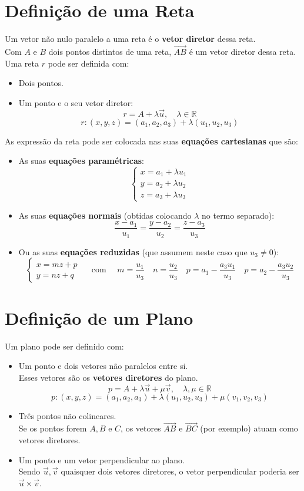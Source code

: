 \documentclass[]{report}
\begin{document}
\section{Definição de uma Reta}
Um vetor não nulo paralelo a uma reta é o \textbf{vetor diretor} dessa reta.\\
Com $A$ e $B$ dois pontos distintos de uma reta, $\overrightarrow{AB}$ é um vetor diretor dessa reta.\\[2mm]
Uma reta $r$ pode ser definida com:
\begin{itemize}
\item Dois pontos.
\item Um ponto e o seu vetor diretor:
$$r = A + \lambda \vec u, \quad \lambda \in \mathbb{R}$$
$$r: (x, y, z) = (a_1, a_2, a_3) + \lambda(u_1, u_2, u_3)$$
\end{itemize}
\vspace{2mm}
As expressão da reta pode ser colocada nas suas \textbf{equações cartesianas} que são:
\begin{itemize}
\item As suas \textbf{equações paramétricas}:
$$
\begin{cases}
x = a_1 + \lambda u_1\\
y = a_2 + \lambda u_2\\
z = a_3 + \lambda u_3
\end{cases}
$$
\item As suas \textbf{equações normais} (obtidas colocando $\lambda$ no termo separado):
$$\frac{x - a_1}{u_1} = \frac{y - a_2}{u_2} = \frac{z - a_3}{u_3}$$
\item Ou as suas \textbf{equações reduzidas} (que assumem neste caso que $u_3 \neq 0$):
$$
\begin{cases}
x = mz + p\\
y = nz + q
\end{cases}
\quad
\text{ com }
\quad
m = \frac{u_1}{u_3}
\quad
n = \frac{u_2}{u_3}
\quad
p = a_1 - \frac{a_3 u_1}{u_3}
\quad
p = a_2 - \frac{a_3 u_2}{u_3}
$$
\end{itemize}
\clearpage
\section{Definição de um Plano}
Um plano pode ser definido com:
\begin{itemize}
\item Um ponto e dois vetores não paralelos entre si.\\
Esses vetores são os \textbf{vetores diretores} do plano.
$$p = A + \lambda \vec u + \mu \vec v, \quad \lambda, \mu \in \mathbb{R}$$
$$p: (x, y, z) = (a_1, a_2, a_3) + \lambda(u_1, u_2, u_3) + \mu(v_1, v_2, v_3)$$
\item Três pontos não colineares.\\
Se os pontos forem $A,B$ e $C$, os vetores $\overrightarrow{AB}$ e $\overrightarrow{BC}$ (por exemplo) atuam como vetores diretores.
\item Um ponto e um vetor perpendicular ao plano.\\
Sendo $\vec u, \vec v$ quaisquer dois vetores diretores, o vetor perpendicular poderia ser $\vec u \times \vec v$.
\end{itemize}
\end{document}
